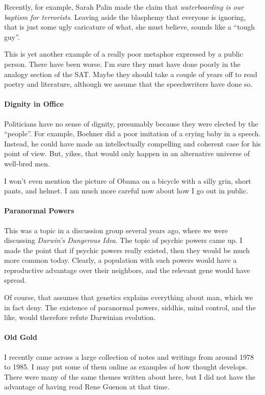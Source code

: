 Recently, for example, Sarah Palin made the claim that \emph{waterboarding is our baptism for terrorists}. Leaving aside the blasphemy that everyone is ignoring, that is just some ugly caricature of what, she must believe, sounds like a ``tough guy''.

This is yet another example of a really poor metaphor expressed by a public person. There have been worse. I'm sure they must have done poorly in the analogy section of the SAT. Maybe they should take a couple of years off to read poetry and literature, although we assume that the speechwriters have done so.

\paragraph{Dignity in Office}


Politicians have no sense of dignity, presumably because they were elected by the ``people''. For example, Boehner did a poor imitation of a crying baby in a speech. Instead, he could have made an intellectually compelling and coherent case for his point of view. But, yikes, that would only happen in an alternative universe of well-bred men.

I won't even mention the picture of Obama on a bicycle with a silly grin, short pants, and helmet. I am much more careful now about how I go out in public.

\paragraph{Paranormal Powers}


This was a topic in a discussion group several years ago, where we were discussing \emph{Darwin's Dangerous Idea}. The topic of psychic powers came up. I made the point that if psychic powers really existed, then they would be much more common today. Clearly, a population with such powers would have a reproductive advantage over their neighbors, and the relevant gene would have spread.

Of course, that assumes that genetics explains everything about man, which we in fact deny. The existence of paranormal powers, siddhis, mind control, and the like, would therefore refute Darwinian evolution.

\paragraph{Old Gold}


I recently came across a large collection of notes and writings from around 1978 to 1985. I may put some of them online as examples of how thought develops. There were many of the same themes written about here, but I did not have the advantage of having read Rene Guenon at that time.



